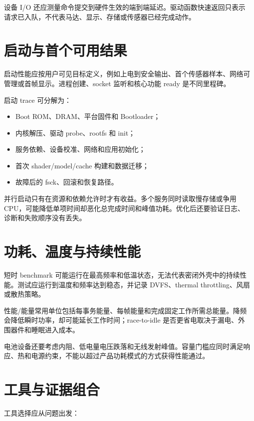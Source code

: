 设备 I/O 还应测量命令提交到硬件生效的端到端延迟。驱动函数快速返回只表示请求已入队，不代表马达、显示、存储或传感器已经完成动作。

\section{启动与首个可用结果}

启动性能应按用户可见目标定义，例如上电到安全输出、首个传感器样本、网络可管理或首帧显示。进程创建、socket 监听和核心功能 ready 是不同里程碑。

启动 trace 可分解为：

\begin{itemize}
  \item Boot ROM、DRAM、平台固件和 Bootloader；
  \item 内核解压、驱动 probe、rootfs 和 init；
  \item 服务依赖、设备校准、网络和应用初始化；
  \item 首次 shader/model/cache 构建和数据迁移；
  \item 故障后的 fsck、回滚和恢复路径。
\end{itemize}

并行启动只有在资源和依赖允许时才有收益。多个服务同时读取慢存储或争用 CPU，可能降低单项时间却恶化总完成时间和峰值功耗。优化后还要验证日志、诊断和失败顺序没有丢失。

\section{功耗、温度与持续性能}

短时 benchmark 可能运行在最高频率和低温状态，无法代表密闭外壳中的持续性能。测试应运行到温度和频率达到稳态，并记录 DVFS、thermal throttling、风扇或散热策略。

性能/能量常用单位包括每事务能量、每帧能量和完成固定工作所需总能量。降频会降低瞬时功率，却可能延长工作时间；race-to-idle 是否更省电取决于漏电、外围器件和睡眠进入成本。

电池设备还要考虑内阻、低电量电压跌落和无线发射峰值。容量门槛应同时满足响应、热和电源约束，不能以超过产品功耗模式的方式获得性能通过。

\section{工具与证据组合}

工具选择应从问题出发\cite{systems-performance-2e}：

